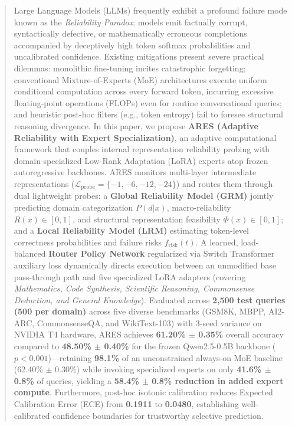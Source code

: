 \documentclass[journal,10pt,twocolumn]{IEEEtran}
\begin{document}
\begin{abstract}
Large Language Models (LLMs) frequently exhibit a profound failure mode known as the \textit{Reliability Paradox}: models emit factually corrupt, syntactically defective, or mathematically erroneous completions accompanied by deceptively high token softmax probabilities and uncalibrated confidence. Existing mitigations present severe practical dilemmas: monolithic fine-tuning incites catastrophic forgetting; conventional Mixture-of-Experts (MoE) architectures execute uniform conditional computation across every forward token, incurring excessive floating-point operations (FLOPs) even for routine conversational queries; and heuristic post-hoc filters (e.g., token entropy) fail to foresee structural reasoning divergence. In this paper, we propose \textbf{ARES (Adaptive Reliability with Expert Specialization)}, an adaptive computational framework that couples internal representation reliability probing with domain-specialized Low-Rank Adaptation (LoRA) experts atop frozen autoregressive backbones. ARES monitors multi-layer intermediate representations ($\mathcal{L}_{\text{probe}} = \{-1, -6, -12, -24\}$) and routes them through dual lightweight probes: a \textbf{Global Reliability Model (GRM)} jointly predicting domain categorization $P(d|x)$, macro-reliability $R(x) \in [0, 1]$, and structural representation feasibility $\Phi(x) \in [0, 1]$; and a \textbf{Local Reliability Model (LRM)} estimating token-level correctness probabilities and failure risks $f_{\text{risk}}(t)$. A learned, load-balanced \textbf{Router Policy Network} regularized via Switch Transformer auxiliary loss dynamically directs execution between an unmodified base pass-through path and five specialized LoRA adapters (covering \textit{Mathematics, Code Synthesis, Scientific Reasoning, Commonsense Deduction, and General Knowledge}). Evaluated across \textbf{2,500 test queries (500 per domain)} across five diverse benchmarks (GSM8K, MBPP, AI2-ARC, CommonsenseQA, and WikiText-103) with 3-seed variance on NVIDIA T4 hardware, ARES achieves \textbf{61.20\% $\pm$ 0.35\%} overall accuracy compared to \textbf{48.50\% $\pm$ 0.40\%} for the frozen Qwen2.5-0.5B backbone ($p < 0.001$)---retaining \textbf{98.1\%} of an unconstrained always-on MoE baseline (62.40\% $\pm$ 0.30\%) while invoking specialized experts on only \textbf{41.6\% $\pm$ 0.8\%} of queries, yielding a \textbf{58.4\% $\pm$ 0.8\% reduction in added expert compute}. Furthermore, post-hoc isotonic calibration reduces Expected Calibration Error (ECE) from \textbf{0.1911} to \textbf{0.0480}, establishing well-calibrated confidence boundaries for trustworthy selective prediction.
\end{abstract}
\end{document}
